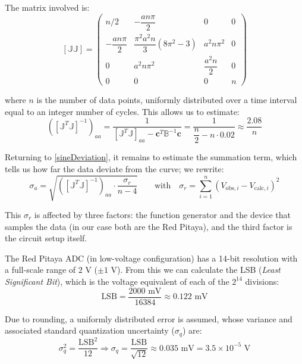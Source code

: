 \documentclass[12pt]{article}
\begin{document}
The matrix involved is:
\begin{equation}
    \left[\mathbb{J}\mathbb{J}\right] =
    \begin{pmatrix}
        n/2 & -\dfrac{an\pi}{2} & 0 & 0 \\[10pt]
        -\dfrac{an\pi}{2} & \dfrac{\pi^2 a^2 n}{3}(8\pi^2-3) & a^2 n\pi^2 & 0 \\[10pt]
        0 & a^2 n\pi^2 & \dfrac{a^2 n}{2} & 0 \\[10pt]
        0 & 0 & 0 & n
    \end{pmatrix}
\end{equation}

where $n$ is the number of data points, uniformly distributed over a time interval equal to an integer number of cycles. This allows us to estimate:
\begin{equation}
    \left(\left[\mathbb{J}^T \mathbb{J}\right]^{-1}\right)_{aa}
    = \frac{1}{\left[\mathbb{J}^T \mathbb{J}\right]_{aa} - \mathbf{c}^T \mathbb{B}^{-1}\mathbf{c}}
    = \frac{1}{\dfrac{n}{2} - n\cdot 0.02}
    \approx \frac{2.08}{n}
\end{equation}

Returning to \eqref{sineDeviation}, it remains to estimate the summation term, which tells us how far the data deviate from the curve; we rewrite:
\begin{equation}
    \sigma_a = \sqrt{\left(\left[\mathbb{J}^T \mathbb{J}\right]^{-1}\right)_{aa} \cdot \frac{\sigma_r}{n-4}}
    \qquad \text{with} \quad \sigma_r = \sum_{i=1}^{n}(V_{\text{obs},i} - V_{\text{calc},i})^2
\end{equation}

This $\sigma_r$ is affected by three factors: the function generator and the device that samples the data (in our case both are the Red Pitaya), and the third factor is the circuit setup itself.

The Red Pitaya ADC (in low-voltage configuration) has a 14-bit resolution with a full-scale range of $2\text{ V}$ ($\pm1\text{ V}$). From this we can calculate the LSB (\textit{Least Significant Bit}), which is the voltage equivalent of each of the $2^{14}$ divisions:
\begin{equation}
\text{LSB} = \frac{2000\text{ mV}}{16384} \approx 0.122\text{ mV}
\end{equation}

Due to rounding, a uniformly distributed error is assumed, whose variance and associated standard quantization uncertainty ($\sigma_q$) are:
\begin{equation}
\sigma_q^2 = \frac{\text{LSB}^2}{12} \Rightarrow \sigma_q = \frac{\text{LSB}}{\sqrt{12}} \approx 0.035\text{ mV} = 3.5 \times 10^{-5}\text{ V}
\end{equation}
\end{document}

